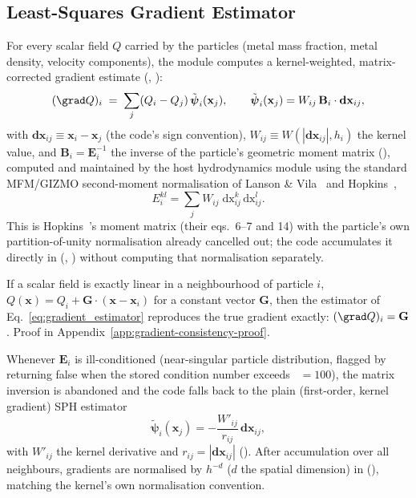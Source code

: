 \subsection{Least-Squares Gradient Estimator}
\label{sec:gradient-estimator}
For every scalar field $Q$ carried by the particles (metal mass
fraction, metal density, velocity components), the module computes a
kernel-weighted, matrix-corrected gradient estimate
(, ):
\begin{equation}
  \label{eq:gradient_estimator}
  (\grad Q)_i \;=\; \sum_{j} (Q_i - Q_j)\, \tilde{\boldsymbol\psi}_i(\mathbf x_j) ,
  \qquad
  \tilde{\boldsymbol\psi}_i(\mathbf x_j) = W_{ij}\, \mathbf B_i \cdot \mathbf{dx}_{ij} ,
\end{equation}
with $\mathbf{dx}_{ij} \equiv \mathbf x_i - \mathbf x_j$ (the code's
sign convention), $W_{ij} \equiv W(|\mathbf{dx}_{ij}|, h_i)$ the kernel
value, and $\mathbf B_i = \mathbf E_i^{-1}$ the inverse of the particle's
geometric moment matrix (), computed and
maintained by the host hydrodynamics module using the standard
MFM/GIZMO second-moment normalisation of Lanson \& Vila~\citeyear{LansonVila2008} and
Hopkins~\citeyear{Hopkins2015},
\begin{equation}
  \label{eq:E_matrix_def}
  E_i^{kl} = \sum_j W_{ij}\; \mathrm{dx}_{ij}^{k}\, \mathrm{dx}_{ij}^{l} .
\end{equation}
This is Hopkins~\citeyear{Hopkins2015}'s moment matrix (their eqs.~6--7
and 14) with the particle's own partition-of-unity normalisation
already cancelled out; the code accumulates it directly in
 (,
) without computing that normalisation
separately.

\begin{proposition}
\label{prop:gradient-consistency}
If a scalar field is exactly linear in a neighbourhood of particle $i$,
$Q(\mathbf x) = Q_i + \mathbf G\cdot(\mathbf x - \mathbf x_i)$ for a
constant vector $\mathbf G$, then the estimator of
Eq.~\eqref{eq:gradient_estimator} reproduces the true gradient exactly:
$(\grad Q)_i = \mathbf G$. Proof in
Appendix~\ref{app:gradient-consistency-proof}.
\end{proposition}

Whenever $\mathbf E_i$ is ill-conditioned (near-singular particle
distribution, flagged by 
returning false when the stored condition number exceeds
~$=100$), the matrix inversion is
abandoned and the code falls back to the plain (first-order, kernel
gradient) SPH estimator
\begin{equation}
  \tilde{\boldsymbol\psi}_i(\mathbf x_j) = -\frac{W'_{ij}}{r_{ij}}\, \mathbf{dx}_{ij} ,
\end{equation}
with $W'_{ij}$ the kernel derivative and $r_{ij} = |\mathbf{dx}_{ij}|$
(). After accumulation over all
neighbours, gradients are normalised by $h^{-d}$ ($d$ the spatial
dimension) in 
(), matching the kernel's own
normalisation convention.

